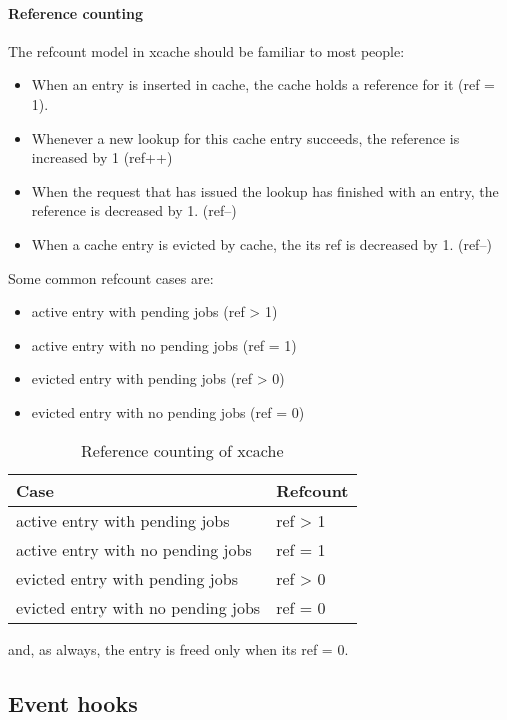 \paragraph{Reference counting}\label{par:refcount-imp}

The refcount model in xcache should be familiar to most people:

\begin{itemize}
	\item When an entry is inserted in cache, the cache holds a reference 
		for it (ref = 1).
	\item Whenever a new lookup for this cache entry succeeds, the reference 
		is increased by 1 (ref++)
	\item When the request that has issued the lookup has finished with an 
		entry, the reference is decreased by 1. (ref--)
	\item When a cache entry is evicted by cache, the its ref is decreased 
		by 1. (ref--)
\end{itemize}

Some common refcount cases are:

\begin{itemize}
	\item active entry with pending jobs (ref > 1)
	\item active entry with no pending jobs (ref = 1)
	\item evicted entry with pending jobs (ref > 0)
	\item evicted entry with no pending jobs (ref = 0)
\end{itemize}

\begin{table}[tbp]
	\centering
	\begin{tabular}{ | l | l | }
		\hline
		Case & Refcount \\ \hline \hline
		active entry with pending jobs & ref > 1 \\ \hline
		active entry with no pending jobs & ref = 1 \\ \hline
		evicted entry with pending jobs & ref > 0 \\ \hline
		evicted entry with no pending jobs & ref = 0 \\ \hline
	\end{tabular}
	\caption{Reference counting of xcache}
	\label{tab:refcount}
\end{table}

and, as always, the entry is freed only when its ref = 0.

\subsection{Event hooks}

